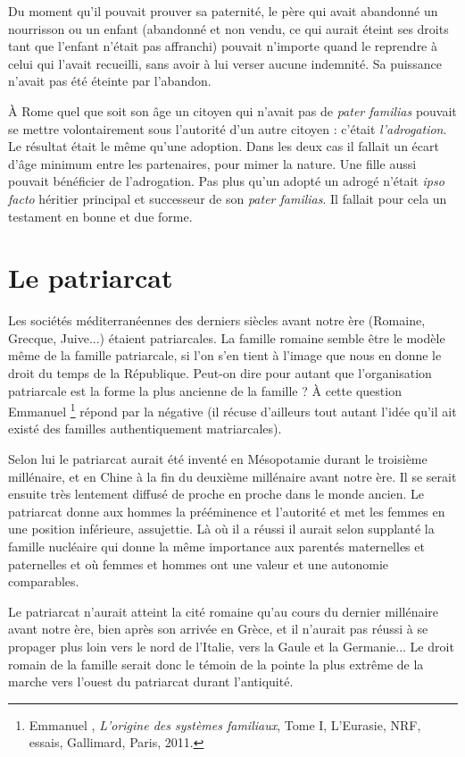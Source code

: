 Du moment qu'il pouvait prouver sa paternité, le père qui avait
abandonné un nourrisson ou un enfant (abandonné et non vendu, ce qui
aurait éteint ses droits tant que l'enfant n'était pas affranchi) pouvait
n'importe quand le reprendre à celui qui l'avait recueilli, sans avoir à lui
verser aucune indemnité. Sa puissance n'avait pas été éteinte par l'abandon.

À Rome quel que soit son âge un citoyen qui n'avait pas de \emph{pater
familias} pouvait se mettre volontairement sous l'autorité d'un autre citoyen :
c'était \emph{l'adrogation}. Le résultat était le même qu'une adoption. Dans
les deux cas il fallait un écart d'âge minimum entre les partenaires, pour
mimer la nature. Une fille aussi pouvait bénéficier de l'adrogation. Pas
plus qu'un adopté un adrogé n'était \emph{ipso facto} héritier principal et successeur
de son \emph{pater familias}. Il fallait pour cela un testament en bonne et
due forme.


\section{Le patriarcat}

Les sociétés méditerranéennes des derniers siècles avant notre ère
(Romaine, Grecque, Juive...) étaient patriarcales. La famille romaine
semble être le modèle même de la famille patriarcale, si l'on s'en tient à
l'image que nous en donne le droit du temps de la République. Peut-on
dire pour autant que l'organisation patriarcale est la forme la plus ancienne
de la famille ? À cette question Emmanuel %
\footnote{Emmanuel , \emph{L'origine des systèmes familiaux}, Tome I, L'Eurasie, NRF,
essais, Gallimard, Paris, 2011.}
répond par
la négative (il récuse d'ailleurs tout autant l'idée qu'il ait existé des familles
authentiquement matriarcales).

Selon lui le patriarcat aurait été inventé en Mésopotamie durant le
troisième millénaire, et en Chine à la fin du deuxième millénaire avant
notre ère. Il se serait ensuite très lentement diffusé de proche en proche
dans le monde ancien. Le patriarcat donne aux hommes la prééminence
et l'autorité et met les femmes en une position inférieure, assujettie. Là
où il a réussi il aurait selon  supplanté la famille nucléaire qui
donne la même importance aux parentés maternelles et paternelles et où
femmes et hommes ont une valeur et une autonomie comparables.

Le patriarcat n'aurait atteint la cité romaine qu'au cours du dernier
millénaire avant notre ère, bien après son arrivée en Grèce, et il n'aurait
pas réussi à se propager plus loin vers le nord de l'Italie, vers la Gaule et
la Germanie... Le droit romain de la famille serait donc le témoin de la
pointe la plus extrême de la marche vers l'ouest du patriarcat durant
l'antiquité.

